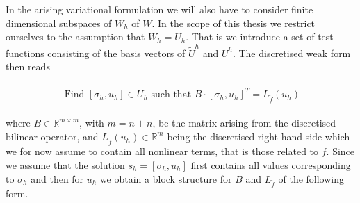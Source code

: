 \documentclass[../draft_1.tex]{subfiles}
\begin{document}
In the arising variational formulation we will also have to consider finite dimensional subspaces of $W_h$ of $W$. In the scope of this thesis we restrict ourselves to the assumption that $W_h = U_h$. That is we introduce a set of test functions consisting of the basis vectors of $\tilde{U}^h$ and $U^h$. The discretised weak form then reads 

\begin{ceqn}
	\begin{align}
	\begin{aligned}
	\text{ Find } [\sigma_h, u_h] \in U_h \text{ such that } B \cdot [\sigma_h, u_h]^T  = L_{\tilde{f}}(u_h) 
	\end{aligned}
	\end{align}
\end{ceqn}

where $B \in \mathbb{R}^{m \times m}$, with $ m = \tilde{n} + n$, be the matrix arising from the discretised bilinear operator, and $L_{\tilde{f}}(u_h) \in \mathbb{R}^m$ being the discretised right-hand side which we for now assume to contain all nonlinear terms, that is those related to $f$. Since we assume that the solution $s_h = [\sigma_h, u_h]$ first contains all values corresponding to $\sigma_h$ and then for $u_h$ we obtain a block structure for $B$ and $L_{\tilde{f}}$ of the following form.
\end{document}
